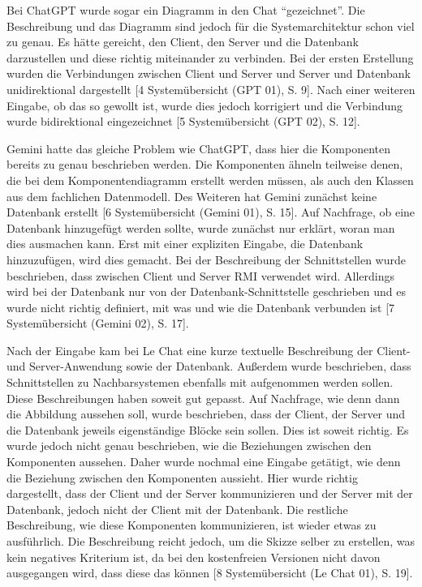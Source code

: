 Bei ChatGPT wurde sogar ein Diagramm in den Chat ``gezeichnet''. Die Beschreibung und das Diagramm sind jedoch für die Systemarchitektur 
schon viel zu genau. Es hätte gereicht, den Client, den Server und die Datenbank darzustellen und diese richtig miteinander zu verbinden. 
Bei der ersten Erstellung wurden die Verbindungen zwischen Client und Server und Server und Datenbank unidirektional dargestellt 
[4 Systemübersicht (GPT 01), S. 9]. Nach einer weiteren Eingabe, ob das so gewollt ist, wurde dies jedoch korrigiert und die Verbindung 
wurde bidirektional eingezeichnet [5 Systemübersicht (GPT 02), S. 12].

Gemini hatte das gleiche Problem wie ChatGPT, dass hier die Komponenten bereits zu genau beschrieben werden. Die Komponenten ähneln 
teilweise denen, die bei dem Komponentendiagramm erstellt werden müssen, als auch den Klassen aus dem fachlichen Datenmodell. Des Weiteren 
hat Gemini zunächst keine Datenbank erstellt [6 Systemübersicht (Gemini 01), S. 15]. Auf Nachfrage, ob eine Datenbank hinzugefügt werden 
sollte, wurde zunächst nur erklärt, woran man dies ausmachen kann. Erst mit einer expliziten Eingabe, die Datenbank hinzuzufügen, wird 
dies gemacht. Bei der Beschreibung der Schnittstellen wurde beschrieben, dass zwischen Client und Server RMI verwendet wird. Allerdings 
wird bei der Datenbank nur von der Datenbank-Schnittstelle geschrieben und es wurde nicht richtig definiert, mit was und wie die 
Datenbank verbunden ist [7 Systemübersicht (Gemini 02), S. 17].

Nach der Eingabe kam bei Le Chat eine kurze textuelle Beschreibung der Client- und Server-Anwendung sowie der Datenbank. Außerdem wurde 
beschrieben, dass Schnittstellen zu Nachbarsystemen ebenfalls mit aufgenommen werden sollen. Diese Beschreibungen haben soweit gut 
gepasst. Auf Nachfrage, wie denn dann die Abbildung aussehen soll, wurde beschrieben, dass der Client, der Server und die Datenbank 
jeweils eigenständige Blöcke sein sollen. Dies ist soweit richtig. Es wurde jedoch nicht genau beschrieben, wie die Beziehungen zwischen 
den Komponenten aussehen. Daher wurde nochmal eine Eingabe getätigt, wie denn die Beziehung zwischen den Komponenten aussieht. Hier 
wurde richtig dargestellt, dass der Client und der Server kommunizieren und der Server mit der Datenbank, jedoch nicht der Client mit 
der Datenbank. Die restliche Beschreibung, wie diese Komponenten kommunizieren, ist wieder etwas zu ausführlich. Die Beschreibung reicht 
jedoch, um die Skizze selber zu erstellen, was kein negatives Kriterium ist, da bei den kostenfreien Versionen nicht davon ausgegangen 
wird, dass diese das können [8 Systemübersicht (Le Chat 01), S. 19].

